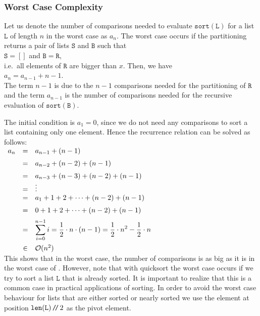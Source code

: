 \subsubsection{Worst Case Complexity}
Let us denote the number of comparisons needed to evaluate $\mathtt{sort}(\mathtt{L})$ for a list $\mathtt{L}$ of
length $n$ in the worst case as $a_n$.  The worst case occurs if the partitioning
returns a pair of lists $\mathtt{S}$ and $\mathtt{B}$ such that
\\[0.2cm]
\hspace*{1.3cm}
$\mathtt{S} = []$ \quad and \quad $\mathtt{B} = \mathtt{R}$,
\\[0.2cm]
i.e.~all elements of $\mathtt{R}$ are bigger than $x$.  Then, we have
\\[0.2cm]
\hspace*{1.3cm}
$a_n = a_{n-1} + n - 1$. 
\\[0.2cm]
The term $n-1$ is due to the $n-1$ comparisons needed for the partitioning of $\mathtt{R}$
and the term $a_{n-1}$ is the number of comparisons needed for the recursive evaluation of $\mathtt{sort}(\mathtt{B})$.

The initial condition is $a_1 = 0$, since we do not need any comparisons to sort a list
containing only one element.
Hence the recurrence relation can be solved as follows:
\\[0.2cm]
\hspace*{1.3cm}
$
\begin{array}{lcl}
  a_n & = & a_{n-1} + (n-1) \\[0.2cm]
      & = & a_{n-2} + (n-2) + (n-1) \\[0.2cm]
      & = & a_{n-3} + (n-3) + (n-2) + (n-1) \\
      & = & \vdots \\
      & = & a_{1} + 1 + 2 + \cdots  + (n-2) + (n-1) \\[0.2cm]
      & = & 0 + 1 + 2 + \cdots  + (n-2) + (n-1) \\[0.2cm]
      & = & \displaystyle \sum\limits_{i=0}^{n-1} i  =  \frac{1}{2} \cdot n \cdot(n - 1) =
            \frac{1}{2} \cdot n^2 - \frac{1}{2} \cdot n \\[0.5cm]
      & \in & \mathcal{O}(n^2)
\end{array}
$
\\[0.2cm]
This shows that in the worst case, the number of comparisons is as big as it is in the worst case of 
.  However, note that with quicksort the worst case occurs if we try to sort a list
$\mathtt{L}$ that is already sorted.  It is important to realize that this is a common case in practical
applications of sorting.  In order to avoid the worst case behaviour for lists that are either sorted or nearly
sorted we use the element at position $\texttt{len}(\texttt{L})\mbox{\,\texttt{/}$\!$\texttt{/}\,} 2$ as the pivot element.


